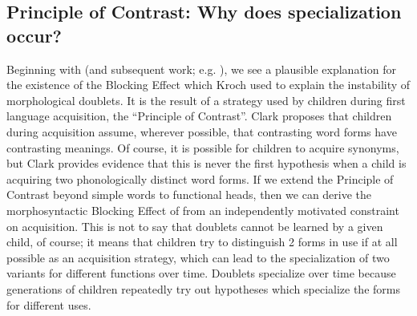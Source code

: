 \subsection{Principle of Contrast: Why does specialization occur?}

Beginning with \citet{clark1987} (and subsequent work; e.g. \citealt{clark1990}), we see a plausible explanation for the existence of the Blocking Effect which Kroch used to explain the instability of morphological doublets.
It is the result of a strategy used by children during first language acquisition, the ``Principle of Contrast''.
Clark proposes that children during acquisition assume, wherever possible, that contrasting word forms have contrasting meanings.
Of course, it is possible for children to acquire synonyms, but Clark provides evidence that this is never the first hypothesis when a child is acquiring two phonologically distinct word forms.
If we extend the Principle of Contrast beyond simple words to functional heads, then we can derive the morphosyntactic Blocking Effect of \citet{kroch1994} from an independently motivated constraint on acquisition.
This is not to say that doublets cannot be learned by a given child, of course; it means that children try to distinguish 2 forms in use if at all possible as an acquisition strategy, which can lead to the specialization of two variants for different functions over time.
Doublets specialize over time because generations of children repeatedly try out hypotheses which specialize the forms for different uses.


